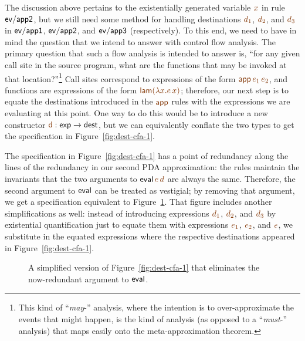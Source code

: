 The discussion above pertains to the existentially generated variable
$\lf{x}$ in rule ${\sf ev/app2}$, but we still need some method for
handling destinations $\lf{d_1}$, $\lf{d_2}$, and $\lf{d_3}$ in ${\sf ev/app1}$,
${\sf ev/app2}$, and ${\sf ev/app3}$ (respectively). To this end, we
need to have in mind the question that we intend to answer with
control flow analysis. The primary question that such a flow analysis
is intended to answer is, ``for any given call site in the source
program, what are the functions that may be invoked at that
location?''\footnote{This kind of ``{\it may}-'' analysis, where the
  intention is to over-approximate the events that might happen, is
  the kind of analysis (as opposed to a ``{\it must}-'' analysis) that
  maps easily onto the meta-approximation theorem.} Call sites
correspond to expressions of the form $\lf{{\sf app}\,e_1\,e_2}$, and
functions are expressions of the form $\lf{{\sf lam}(\lambda x.e\,x)}$;
therefore, our next step is to equate the destinations introduced in
the $\lf{\sf app}$ rules with the expressions we are evaluating at this
point. One way to do this would be to introduce a new constructor
$\lf{\sf d}: {\sf exp} \rightarrow {\sf dest}$, but we can equivalently
conflate the two types to get the specification in
Figure~\ref{fig:dest-cfa-1}. 


The specification in Figure~\ref{fig:dest-cfa-1} has a point of
redundancy along the lines of the redundancy in our second PDA
approximation: the rules maintain the invariants that the two
arguments to ${\sf eval}\,\lf{e}\,\lf{d}$ are always the same. Therefore, the
second argument to ${\sf eval}$ can be treated as vestigial; by
removing that argument, we get a specification equivalent to
Figure~\ref{fig:dest-cfa-2}. That figure includes another
simplifications as well: instead of introducing expressions $\lf{d_1}$,
$\lf{d_2}$, and $\lf{d_3}$ by existential quantification just to equate them
with expressions $\lf{e_1}$, $\lf{e_2}$, and $\lf{e}$, 
we substitute in the equated
expressions where the respective destinations appeared in
Figure~\ref{fig:dest-cfa-1}. 

\begin{figure}[t]
\caption{A simplified version of Figure~\ref{fig:dest-cfa-1} that
  eliminates the now-redundant argument to ${\sf eval}$.}
\label{fig:dest-cfa-2}
\end{figure}


